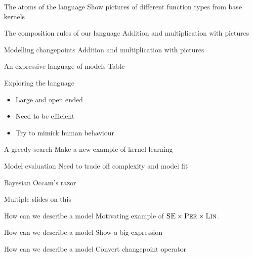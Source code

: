 \begin{frame}{The atoms of the language}
  Show pictures of different function types from base kernels
\end{frame}

\begin{frame}{The composition rules of our language}
  Addition and multiplication with pictures
\end{frame}

\begin{frame}{Modelling changepoints}
  Addition and multiplication with pictures
\end{frame}

\begin{frame}{An expressive language of models}
  Table
\end{frame}

\begin{frame}{Exploring the language}
  \begin{itemize}
    \item Large and open ended
    \vspace{\baselineskip}
    \item Need to be efficient
    \vspace{\baselineskip}
    \item Try to mimick human behaviour
  \end{itemize}
\end{frame}

\begin{frame}{A greedy search}
  Make a new example of kernel learning
\end{frame}

\begin{frame}{Model evaluation}
  Need to trade off complexity and model fit
  
  Bayesian Occam's razor
  
  Multiple slides on this
\end{frame}

\begin{frame}{How can we describe a model}
  Motivating example of ${\textsc{SE}} \times {\textsc{Per}} \times {\textsc{Lin}}$.
\end{frame}

\begin{frame}{How can we describe a model}
  Show a big expression
\end{frame}

\begin{frame}{How can we describe a model}
  Convert changepoint operator
\end{frame}

